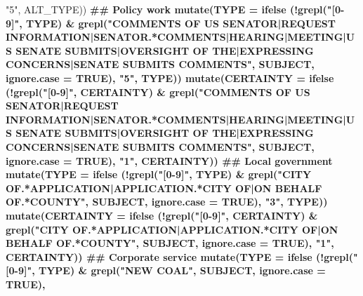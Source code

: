 \documentclass[]{article}
\newenvironment{Shaded}{\begin{snugshade}}{\end{snugshade}}
\newcommand{\KeywordTok}[1]{\textcolor[rgb]{0.13,0.29,0.53}{\textbf{#1}}}
\newcommand{\DataTypeTok}[1]{\textcolor[rgb]{0.13,0.29,0.53}{#1}}
\newcommand{\StringTok}[1]{\textcolor[rgb]{0.31,0.60,0.02}{#1}}
\newcommand{\OtherTok}[1]{\textcolor[rgb]{0.56,0.35,0.01}{#1}}
\newcommand{\OperatorTok}[1]{\textcolor[rgb]{0.81,0.36,0.00}{\textbf{#1}}}
\newcommand{\NormalTok}[1]{#1}
\begin{document}
\begin{Shaded}
\begin{Highlighting}[]
{{{{                            \StringTok{"5"}\NormalTok{, ALT_TYPE)) }\OperatorTok{%
\StringTok{  }\NormalTok{## Policy work}
\StringTok{  }\KeywordTok{mutate}\NormalTok{(}\DataTypeTok{TYPE =} \KeywordTok{ifelse}\NormalTok{ (}\OperatorTok{!}\KeywordTok{grepl}\NormalTok{(}\StringTok{"[0-9]"}\NormalTok{, TYPE) }\OperatorTok{&}\StringTok{ }\KeywordTok{grepl}\NormalTok{(}\StringTok{"COMMENTS OF US SENATOR|REQUEST INFORMATION|SENATOR.*COMMENTS|HEARING|MEETING|US SENATE SUBMITS|OVERSIGHT OF THE|EXPRESSING CONCERNS|SENATE SUBMITS COMMENTS"}\NormalTok{, SUBJECT, }\DataTypeTok{ignore.case =} \OtherTok{TRUE}\NormalTok{), }
                        \StringTok{"5"}\NormalTok{, TYPE)) }\OperatorTok{%
\StringTok{  }\KeywordTok{mutate}\NormalTok{(}\DataTypeTok{CERTAINTY =} \KeywordTok{ifelse}\NormalTok{ (}\OperatorTok{!}\KeywordTok{grepl}\NormalTok{(}\StringTok{"[0-9]"}\NormalTok{, CERTAINTY) }\OperatorTok{&}\StringTok{ }\KeywordTok{grepl}\NormalTok{(}\StringTok{"COMMENTS OF US SENATOR|REQUEST INFORMATION|SENATOR.*COMMENTS|HEARING|MEETING|US SENATE SUBMITS|OVERSIGHT OF THE|EXPRESSING CONCERNS|SENATE SUBMITS COMMENTS"}\NormalTok{, SUBJECT, }\DataTypeTok{ignore.case =} \OtherTok{TRUE}\NormalTok{), }
                             \StringTok{"1"}\NormalTok{, CERTAINTY)) }\OperatorTok{%
\StringTok{  }\NormalTok{## Local government}
\StringTok{  }\KeywordTok{mutate}\NormalTok{(}\DataTypeTok{TYPE =} \KeywordTok{ifelse}\NormalTok{ (}\OperatorTok{!}\KeywordTok{grepl}\NormalTok{(}\StringTok{"[0-9]"}\NormalTok{, TYPE) }\OperatorTok{&}\StringTok{ }\KeywordTok{grepl}\NormalTok{(}\StringTok{"CITY OF.*APPLICATION|APPLICATION.*CITY OF|ON BEHALF OF.*COUNTY"}\NormalTok{, SUBJECT, }\DataTypeTok{ignore.case =} \OtherTok{TRUE}\NormalTok{), }
                        \StringTok{"3"}\NormalTok{, TYPE)) }\OperatorTok{%
\StringTok{  }\KeywordTok{mutate}\NormalTok{(}\DataTypeTok{CERTAINTY =} \KeywordTok{ifelse}\NormalTok{ (}\OperatorTok{!}\KeywordTok{grepl}\NormalTok{(}\StringTok{"[0-9]"}\NormalTok{, CERTAINTY) }\OperatorTok{&}\StringTok{ }\KeywordTok{grepl}\NormalTok{(}\StringTok{"CITY OF.*APPLICATION|APPLICATION.*CITY OF|ON BEHALF OF.*COUNTY"}\NormalTok{, SUBJECT, }\DataTypeTok{ignore.case =} \OtherTok{TRUE}\NormalTok{), }
                             \StringTok{"1"}\NormalTok{, CERTAINTY)) }\OperatorTok{%
\StringTok{  }\NormalTok{## Corporate service}
\StringTok{  }\KeywordTok{mutate}\NormalTok{(}\DataTypeTok{TYPE =} \KeywordTok{ifelse}\NormalTok{ (}\OperatorTok{!}\KeywordTok{grepl}\NormalTok{(}\StringTok{"[0-9]"}\NormalTok{, TYPE) }\OperatorTok{&}\StringTok{ }\KeywordTok{grepl}\NormalTok{(}\StringTok{"NEW COAL"}\NormalTok{, SUBJECT, }\DataTypeTok{ignore.case =} \OtherTok{TRUE}\NormalTok{), }
}}}}}}}}}
\end{Highlighting}
\end{Shaded}
\end{document}
